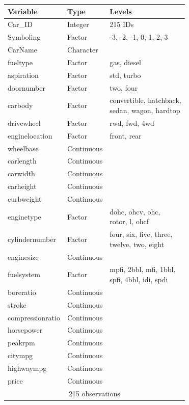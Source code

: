 \documentclass[a4paper, 10pt, titlepage]{article}
\newcommand\Bstrut{\rule[-1.2ex]{0pt}{0pt}}   %
\begin{document}
\begin{table}[!ht]
	\centering
	\begin{tabular}{|l|l|l|}
		\hline
		\textbf{Variable} & \textbf{Type} & \textbf{Levels}\\
		\hline
		Car\_ID & Integer & 215 IDs\\
		Symboling & Factor & -3, -2, -1, 0, 1, 2, 3\\
		CarName & Character & \\
		fueltype & Factor & gas, diesel\\
		aspiration & Factor & std, turbo\\
		doornumber & Factor & two, four\\
		carbody & Factor & \makecell[tl]{convertible, hatchback, \\sedan, wagon, hardtop\Bstrut}\\
		drivewheel & Factor & rwd, fwd, 4wd\\
		enginelocation & Factor & front, rear\\
		wheelbase & Continuous & \\
		carlength & Continuous & \\
		carwidth & Continuous & \\
		carheight & Continuous & \\
		curbweight & Continuous & \\
		enginetype & Factor & \makecell[tl]{dohc, ohcv, ohc, \\rotor, l, ohcf\Bstrut}\\
		cylindernumber & Factor & \makecell[tl]{four, six, five, three, \\twelve, two, eight\Bstrut}\\
		enginesize & Continuous & \\
		fuelsystem & Factor & \makecell[tl]{mpfi, 2bbl, mfi, 1bbl, \\spfi, 4bbl, idi, spdi\Bstrut}\\
		boreratio & Continuous & \\
		stroke & Continuous & \\
		compressionratio & Continuous & \\
		horsepower & Continuous & \\
		peakrpm & Continuous & \\
		citympg & Continuous & \\
		highwaympg & Continuous & \\
		price & Continuous & \\
		\hline
		\multicolumn{3}{|c|}{215 observations}\\
		\hline
	\end{tabular}
	\label{table:orig data summary}
\end{table}
\end{document}
